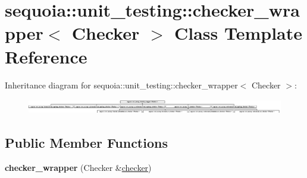 \hypertarget{classsequoia_1_1unit__testing_1_1checker__wrapper}{}\section{sequoia\+::unit\+\_\+testing\+::checker\+\_\+wrapper$<$ Checker $>$ Class Template Reference}
\label{classsequoia_1_1unit__testing_1_1checker__wrapper}
Inheritance diagram for sequoia\+::unit\+\_\+testing\+::checker\+\_\+wrapper$<$ Checker $>$\+:\begin{figure}[H]
\begin{center}
\leavevmode
\includegraphics[height=0.657277cm]{classsequoia_1_1unit__testing_1_1checker__wrapper}
\end{center}
\end{figure}
\subsection*{Public Member Functions}
\begin{DoxyCompactItemize}
\item 
\mbox{\label{classsequoia_1_1unit__testing_1_1checker__wrapper_aabe0c16f2a7d3e4d20dd3d8328dcf9c0}} 
{\bfseries checker\+\_\+wrapper} (Checker \&\mbox{\hyperlink{classsequoia_1_1unit__testing_1_1checker}{checker}})
\end{DoxyCompactItemize}
